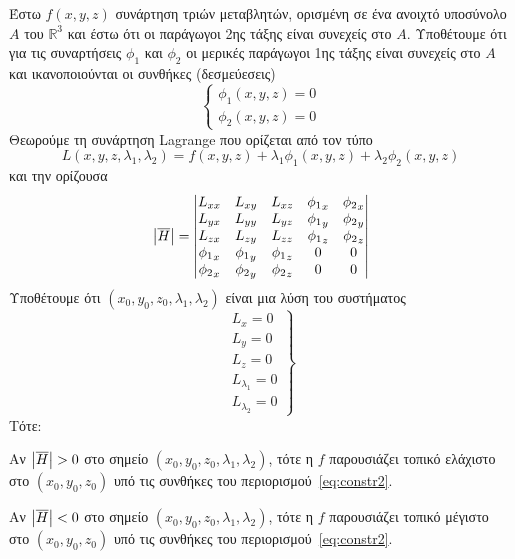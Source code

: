 \begin{thm}
    Έστω $ f(x,y,z) $ συνάρτηση τριών μεταβλητών, ορισμένη σε ένα ανοιχτό 
    υποσύνολο $A$ του $ \mathbb{R}^{3} $ και έστω ότι οι παράγωγοι 2ης τάξης είναι 
    συνεχείς στο $A$. Υποθέτουμε ότι για τις συναρτήσεις $ \phi _{1} $ και 
    $ \phi _{2} $ οι μερικές παράγωγοι 1ης τάξης είναι συνεχείς στο $A$ και 
    ικανοποιούνται οι συνθήκες (δεσμεύεσεις) 
    \[
        \begin{cases}\label{eq:constr2}
            \phi_{1} (x,y,z) = 0 \\
            \phi_{2} (x,y,z) = 0 
        \end{cases} 
    \] 
    Θεωρούμε τη συνάρτηση Lagrange που ορίζεται από τον τύπο
    \[
        L(x,y,z, \lambda _{1}, \lambda _{2}) = f(x,y,z) + \lambda _{1} 
        \phi _{1}(x,y,z) + \lambda _{2} \phi _{2}(x,y,z) 
    \] 
    και την ορίζουσα 
    \[
        \abs{\overline{H}} = 
        \begin{vmatrix}
            L_{xx} & L_{xy} & L_{xz} & {\phi _{1}}_{x} & {\phi _{2}}_{x} \\
            L_{yx} & L_{yy} & L_{yz} & {\phi _{1}}_{y} & {\phi _{2}}_{y} \\
            L_{zx} & L_{zy} & L_{zz} & {\phi _{1}}_{z} & {\phi _{2}}_{z} \\
            {\phi _{1}}_{x} & {\phi _{1}}_{y} & {\phi _{1}}_{z} & 0 & 0 \\         
            {\phi _{2}}_{x} & {\phi _{2}}_{y} & {\phi _{2}}_{z} & 0 & 0 \\         
        \end{vmatrix} 
    \] 
    Υποθέτουμε ότι $ (x_{0}, y_{0}, z_{0}, \lambda _{1}, \lambda _{2}) $ είναι μια 
    λύση του συστήματος 
    \[
        \left.
            \begin{matrix}
                L_{x} = 0 \\
                L_{y} = 0 \\
                L_{z} = 0 \\
                L_{\lambda _{1}} = 0 \\
                L_{\lambda _{2}} = 0 
            \end{matrix}
        \right\} 
    \]
    Τότε:
    \begin{myitemize}
        \item Αν $ \abs{\overline{H}} > 0 $ στο σημείο 
            $ (x_{0}, y_{0}, z_{0}, \lambda _{1}, \lambda _{2}) $, τότε η $f$ 
            παρουσιάζει τοπικό ελάχιστο στο $ (x_{0}, y_{0}, z_{0}) $ υπό τις 
            συνθήκες του περιορισμού~\eqref{eq:constr2}.
        \item Αν $ \abs{\overline{H}} < 0 $ στο σημείο 
            $ (x_{0}, y_{0}, z_{0}, \lambda _{1}, \lambda _{2}) $, τότε η $f$ 
            παρουσιάζει τοπικό μέγιστο στο $ (x_{0}, y_{0}, z_{0}) $ υπό τις 
            συνθήκες του περιορισμού~\eqref{eq:constr2}.
    \end{myitemize}
\end{thm}





   
